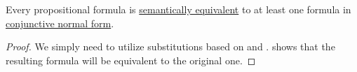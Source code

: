 \begin{proposition}\label{thm:conjunctive_normal_form_reduction}
  Every propositional formula is \hyperref[def:propositional_interpretation/equivalence]{semantically equivalent} to at least one formula in \hyperref[def:conjunctive_disjunctive_normal_form/normal_form]{conjunctive normal form}.
\end{proposition}
\begin{proof}
  We simply need to utilize substitutions based on  and .  shows that the resulting formula will be equivalent to the original one.
\end{proof}
